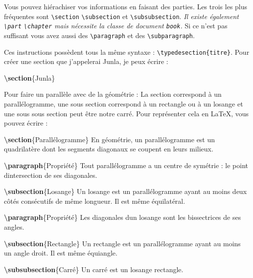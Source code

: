 \documentclass[A4paper
]{article}
\newenvironment{Shaded}{}{}
\newcommand{\KeywordTok}[1]{\textcolor[rgb]{0.00,0.44,0.13}{\textbf{#1}}}
\newcommand{\NormalTok}[1]{#1}
\begin{document}
Vous pouvez hiérachiser vos informations en faisant des parties. Les
trois les plus fréquentes sont \texttt{\textbackslash{}section}
\texttt{\textbackslash{}subsection} et
\texttt{\textbackslash{}subsubsection}. \emph{Il existe également
\texttt{\textbackslash{}part} \texttt{\textbackslash{}chapter} mais
nécessite la classe de document \texttt{book}.} Si ce n'est pas
suffisant vous avez aussi des \texttt{\textbackslash{}paragraph} et des
\texttt{\textbackslash{}subparagraph}.

Ces instructions possèdent tous la même syntaxe :
\texttt{\textbackslash{}typedesection\{titre\}}. Pour créer une section
que j'appelerai Junla, je peux écrire :

\begin{Shaded}
\begin{Highlighting}[]
\KeywordTok{\textbackslash{}section}\NormalTok{\{Junla\}}
\end{Highlighting}
\end{Shaded}

Pour faire un parallèle avec de la géométrie : La section correspond à
un parallélogramme, une sous section correspond à un rectangle ou à un
losange et une sous sous section peut être notre carré. Pour représenter
cela en \LaTeX, vous pouvez écrire :

\begin{Shaded}
\begin{Highlighting}[]
\KeywordTok{\textbackslash{}section}\NormalTok{\{Parallélogramme\}}
\NormalTok{En géométrie, un parallélogramme est un quadrilatère dont les segments diagonaux se coupent en leurs milieux.}

\KeywordTok{\textbackslash{}paragraph}\NormalTok{\{Propriété\}}
\NormalTok{Tout parallélogramme a un centre de symétrie : le point d\textquotesingle{}intersection de ses diagonales.}

\KeywordTok{\textbackslash{}subsection}\NormalTok{\{Losange\}}
\NormalTok{Un losange est un parallélogramme ayant au moins deux côtés consécutifs de même longueur. Il est même équilatéral.}

\KeywordTok{\textbackslash{}paragraph}\NormalTok{\{Propriété\} Les diagonales d\textquotesingle{}un losange sont les bissectrices de ses angles.}

\KeywordTok{\textbackslash{}subsection}\NormalTok{\{Rectangle\}}
\NormalTok{Un rectangle est un parallélogramme ayant au moins un angle droit. Il est même équiangle.}

\KeywordTok{\textbackslash{}subsubsection}\NormalTok{\{Carré\}}
\NormalTok{Un carré est un losange rectangle.}
\end{Highlighting}
\end{Shaded}
\end{document}
